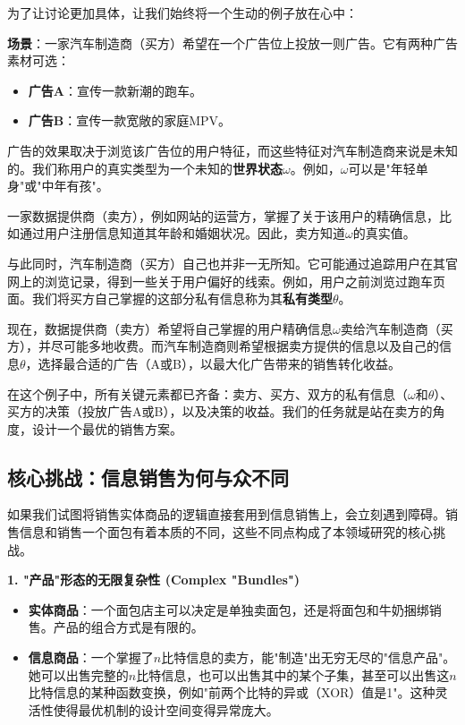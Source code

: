 为了让讨论更加具体，让我们始终将一个生动的例子放在心中：

\textbf{场景}：一家汽车制造商（买方）希望在一个广告位上投放一则广告。它有两种广告素材可选：
\begin{itemize}
   \item \textbf{广告A}：宣传一款新潮的跑车。
   \item \textbf{广告B}：宣传一款宽敞的家庭MPV。
\end{itemize}

广告的效果取决于浏览该广告位的用户特征，而这些特征对汽车制造商来说是未知的。我们称用户的真实类型为一个未知的\textbf{世界状态}$\omega$。例如，$\omega$可以是"年轻单身"或"中年有孩"。

一家数据提供商（卖方），例如网站的运营方，掌握了关于该用户的精确信息，比如通过用户注册信息知道其年龄和婚姻状况。因此，卖方知道$\omega$的真实值。

与此同时，汽车制造商（买方）自己也并非一无所知。它可能通过追踪用户在其官网上的浏览记录，得到一些关于用户偏好的线索。例如，用户之前浏览过跑车页面。我们将买方自己掌握的这部分私有信息称为其\textbf{私有类型}$\theta$。

现在，数据提供商（卖方）希望将自己掌握的用户精确信息$\omega$卖给汽车制造商（买方），并尽可能多地收费。而汽车制造商则希望根据卖方提供的信息以及自己的信息$\theta$，选择最合适的广告（A或B），以最大化广告带来的销售转化收益。

在这个例子中，所有关键元素都已齐备：卖方、买方、双方的私有信息（$\omega$和$\theta$）、买方的决策（投放广告A或B），以及决策的收益。我们的任务就是站在卖方的角度，设计一个最优的销售方案。

\subsection{核心挑战：信息销售为何与众不同}

如果我们试图将销售实体商品的逻辑直接套用到信息销售上，会立刻遇到障碍。销售信息和销售一个面包有着本质的不同，这些不同点构成了本领域研究的核心挑战。

\textbf{1. "产品"形态的无限复杂性 (Complex "Bundles")}
\begin{itemize}
   \item \textbf{实体商品}：一个面包店主可以决定是单独卖面包，还是将面包和牛奶捆绑销售。产品的组合方式是有限的。
   \item \textbf{信息商品}：一个掌握了$n$比特信息的卖方，能"制造"出无穷无尽的"信息产品"。她可以出售完整的$n$比特信息，也可以出售其中的某个子集，甚至可以出售这$n$比特信息的某种函数变换，例如"前两个比特的异或（XOR）值是1"。这种灵活性使得最优机制的设计空间变得异常庞大。
\end{itemize}

